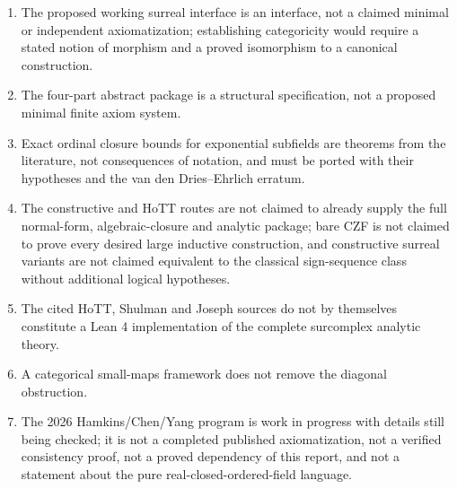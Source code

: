 \documentclass[11pt,letterpaper]{article}
\numberwithin{equation}{section}
\theoremstyle{definition}
\theoremstyle{remark}
\begin{document}
\begin{enumerate}
inconsistent.
\item The proposed working surreal interface is an interface, not a claimed
minimal or independent axiomatization; establishing categoricity would require a
stated notion of morphism and a proved isomorphism to a canonical construction.
\item The four-part abstract package is a structural specification, not a
proposed minimal finite axiom system.
\item Exact ordinal closure bounds for exponential subfields are theorems from
the literature, not consequences of notation, and must be ported with their
hypotheses and the van den Dries--Ehrlich erratum.
\item The constructive and HoTT routes are not claimed to already supply the
full normal-form, algebraic-closure and analytic package; bare CZF is not
claimed to prove every desired large inductive construction, and constructive
surreal variants are not claimed equivalent to the classical sign-sequence class
without additional logical hypotheses.
\item The cited HoTT, Shulman and Joseph sources do not by themselves constitute
a Lean 4 implementation of the complete surcomplex analytic theory.
\item A categorical small-maps framework does not remove the diagonal
obstruction.
\item The 2026 Hamkins/Chen/Yang program is work in progress with details still
being checked; it is not a completed published axiomatization, not a verified
consistency proof, not a proved dependency of this report, and not a statement
about the pure real-closed-ordered-field language.
\end{enumerate}
\end{document}
